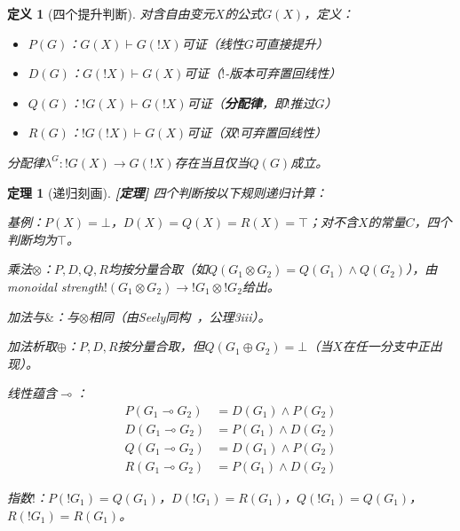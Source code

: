 \documentclass[11pt,a4paper]{article}
\newtheorem{definition}{定义}
\newtheorem{theorem}{定理}
\newcommand{\lvl}[1]{\hfill\textbf{\footnotesize[#1]}}
\newcommand{\lvP}{\lvl{定理}}
\newcommand{\lolli}{\multimap}
\newcommand{\bang}{{!}}
\newcommand{\tensor}{\otimes}
\begin{document}
\begin{definition}[四个提升判断]
对含自由变元$X$的公式$G(X)$，定义：
\begin{itemize}
  \item $P(G)$：$G(X)\vdash G(\bang X)$可证（线性$G$可直接提升）
  \item $D(G)$：$G(\bang X)\vdash G(X)$可证（$\bang$-版本可弃置回线性）
  \item $Q(G)$：$\bang G(X)\vdash G(\bang X)$可证（\textbf{分配律}，即$\bang$推过$G$）
  \item $R(G)$：$\bang G(\bang X)\vdash G(X)$可证（双$\bang$可弃置回线性）
\end{itemize}
分配律$\lambda^G:\bang G(X)\to G(\bang X)$存在当且仅当$Q(G)$成立。
\end{definition}

\begin{theorem}[递归刻画]\label{thm:recursive-characterization}\lvP
四个判断按以下规则递归计算：

\noindent 基例：$P(X)=\bot$，$D(X)=Q(X)=R(X)=\top$；对不含$X$的常量$C$，四个判断均为$\top$。

\noindent 乘法$\tensor$：$P,D,Q,R$均按分量合取（如$Q(G_1\tensor G_2)=Q(G_1)\land Q(G_2)$），由monoidal strength$\bang(G_1\tensor G_2)\to\bang G_1\tensor\bang G_2$给出。

\noindent 加法与$\&$：与$\tensor$相同（由Seely同构~\cite{seely89}，公理3iii）。

\noindent 加法析取$\oplus$：$P,D,R$按分量合取，但$Q(G_1\oplus G_2)=\bot$（当$X$在任一分支中正出现）。

\noindent 线性蕴含$\lolli$：
\begin{align*}
P(G_1\lolli G_2) &= D(G_1)\land P(G_2)\\
D(G_1\lolli G_2) &= P(G_1)\land D(G_2)\\
Q(G_1\lolli G_2) &= D(G_1)\land P(G_2)\\
R(G_1\lolli G_2) &= P(G_1)\land D(G_2)
\end{align*}

\noindent 指数$\bang$：$P(\bang G_1)=Q(G_1)$，$D(\bang G_1)=R(G_1)$，$Q(\bang G_1)=Q(G_1)$，$R(\bang G_1)=R(G_1)$。
\end{theorem}
\end{document}
